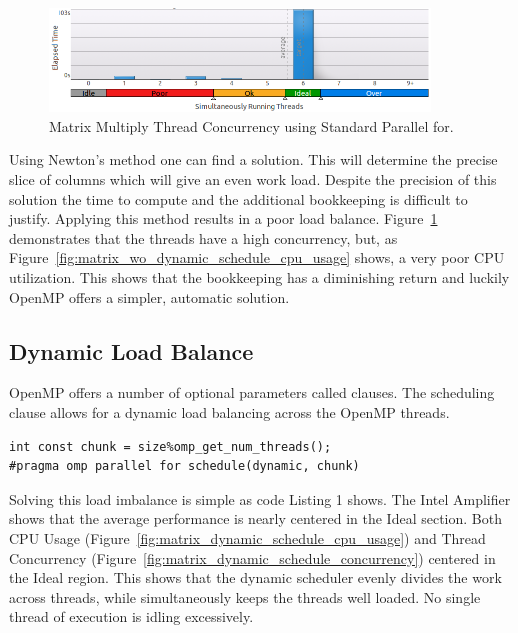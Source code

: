 \documentclass[journal,10pt,onecolumn]{IEEEtran}
\begin{document}
\begin{figure}[!t]
\begin{center}
\includegraphics[width=0.9\textwidth]{figures/matrix_without_dynamic_schedule_thread_concurrency.png}
\caption{Matrix Multiply Thread Concurrency using Standard Parallel for.}
\label{fig:matrix_wo_dynamic_schedule_concurrency}
\end{center}
\end{figure}
Using Newton's method one can find a solution. This will determine the precise slice of
 columns which will give an even work load. 
Despite the precision of this solution the time to compute and the additional bookkeeping
is difficult to justify. Applying this method results in a poor load balance.  
Figure~\ref{fig:matrix_wo_dynamic_schedule_concurrency} demonstrates that the threads have a high 
concurrency, but, as Figure~\ref{fig:matrix_wo_dynamic_schedule_cpu_usage} shows, a very poor CPU 
utilization. This shows that the bookkeeping has a diminishing 
return and luckily OpenMP offers a simpler, automatic solution.

\subsection{Dynamic Load Balance}
OpenMP offers a number of optional parameters called clauses. The scheduling clause allows
for a dynamic load balancing across the OpenMP threads.  

\label{lst:AutomaticLoadBalancing}
\begin{lstlisting}
int const chunk = size%omp_get_num_threads();
#pragma omp parallel for schedule(dynamic, chunk)
\end{lstlisting}
Solving this load imbalance is simple as code Listing 1 shows.
The Intel Amplifier shows that the average performance is nearly centered in the Ideal
section. Both CPU Usage (Figure~\ref{fig:matrix_dynamic_schedule_cpu_usage}) and 
Thread Concurrency (Figure~\ref{fig:matrix_dynamic_schedule_concurrency}) centered in the 
Ideal region. This shows that the dynamic scheduler evenly divides the work across threads, 
while simultaneously keeps the threads well loaded.  No single thread of execution is idling 
excessively.
\end{document}
